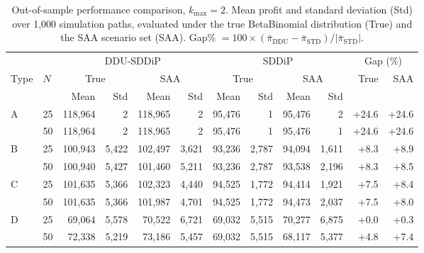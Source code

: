 \begin{table}[ht]
\centering
\caption{Out-of-sample performance comparison, $k_{\max}=2$. Mean profit and standard deviation (Std) over 1{,}000 simulation paths, evaluated under the true BetaBinomial distribution (True) and the SAA scenario set (SAA). Gap\% $= 100\times(\bar\pi_{\text{DDU}} - \bar\pi_{\text{STD}})/|\bar\pi_{\text{STD}}|$.}
\label{tab:perf_k2}
\small
\begin{tabular}{ll rr rr rr rr rr}
\toprule
 & & \multicolumn{4}{c}{DDU-SDDiP} & \multicolumn{4}{c}{SDDiP} & \multicolumn{2}{c}{Gap (\%)} \\
\cmidrule(lr){3-6}\cmidrule(lr){7-10}\cmidrule(lr){11-12}
Type & $N$ & \multicolumn{2}{c}{True} & \multicolumn{2}{c}{SAA} & \multicolumn{2}{c}{True} & \multicolumn{2}{c}{SAA} & True & SAA \\
\cmidrule(lr){3-4}\cmidrule(lr){5-6}\cmidrule(lr){7-8}\cmidrule(lr){9-10}
& & Mean & Std & Mean & Std & Mean & Std & Mean & Std & & \\
\midrule
A & 25 & 118,964 & 2 & 118,965  & 2 & 95,476 & 1 & 95,476  & 2 & +24.6 & +24.6 \\
 & 50 & 118,964 & 2 & 118,965  & 2 & 95,476 & 1 & 95,476  & 1 & +24.6 & +24.6 \\
\midrule
B & 25 & 100,943 & 5,422 & 102,497  & 3,621 & 93,236 & 2,787 & 94,094  & 1,611 & +8.3 & +8.9 \\
 & 50 & 100,940 & 5,427 & 101,460  & 5,211 & 93,236 & 2,787 & 93,538  & 2,196 & +8.3 & +8.5 \\
\midrule
C & 25 & 101,635 & 5,366 & 102,323  & 4,440 & 94,525 & 1,772 & 94,414  & 1,921 & +7.5 & +8.4 \\
 & 50 & 101,635 & 5,366 & 101,987  & 4,701 & 94,525 & 1,772 & 94,473  & 2,037 & +7.5 & +8.0 \\
\midrule
D & 25 & 69,064 & 5,578 & 70,522  & 6,721 & 69,032 & 5,515 & 70,277  & 6,875 & +0.0 & +0.3 \\
 & 50 & 72,338 & 5,219 & 73,186  & 5,457 & 69,032 & 5,515 & 68,117  & 5,377 & +4.8 & +7.4 \\
\bottomrule
\end{tabular}
\end{table}